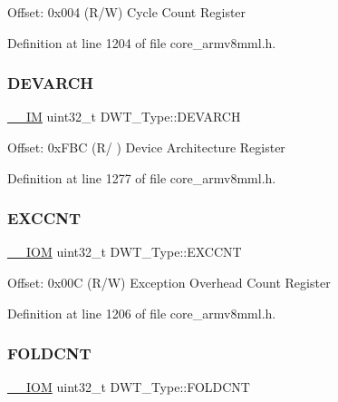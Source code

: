 Offset\+: 0x004 (R/W) Cycle Count Register 

Definition at line 1204 of file core\+\_\+armv8mml.\+h.

\mbox{\label{struct_d_w_t___type_ae60dbff3143d15cd04ac984084d8fbc7}} 
\subsubsection{\texorpdfstring{D\+E\+V\+A\+R\+CH}{DEVARCH}}
{\footnotesize\ttfamily \hyperlink{core__sc300_8h_a4cc1649793116d7c2d8afce7a4ffce43}{\+\_\+\+\_\+\+IM} uint32\+\_\+t D\+W\+T\+\_\+\+Type\+::\+D\+E\+V\+A\+R\+CH}

Offset\+: 0x\+F\+BC (R/ ) Device Architecture Register 

Definition at line 1277 of file core\+\_\+armv8mml.\+h.

\mbox{\label{struct_d_w_t___type_a9fe20c16c5167ca61486caf6832686d1}} 
\subsubsection{\texorpdfstring{E\+X\+C\+C\+NT}{EXCCNT}}
{\footnotesize\ttfamily \hyperlink{core__sc300_8h_ab6caba5853a60a17e8e04499b52bf691}{\+\_\+\+\_\+\+I\+OM} uint32\+\_\+t D\+W\+T\+\_\+\+Type\+::\+E\+X\+C\+C\+NT}

Offset\+: 0x00C (R/W) Exception Overhead Count Register 

Definition at line 1206 of file core\+\_\+armv8mml.\+h.

\mbox{\label{struct_d_w_t___type_a1cfc48384ebd8fd8fb7e5d955aae6c97}} 
\subsubsection{\texorpdfstring{F\+O\+L\+D\+C\+NT}{FOLDCNT}}
{\footnotesize\ttfamily \hyperlink{core__sc300_8h_ab6caba5853a60a17e8e04499b52bf691}{\+\_\+\+\_\+\+I\+OM} uint32\+\_\+t D\+W\+T\+\_\+\+Type\+::\+F\+O\+L\+D\+C\+NT}

